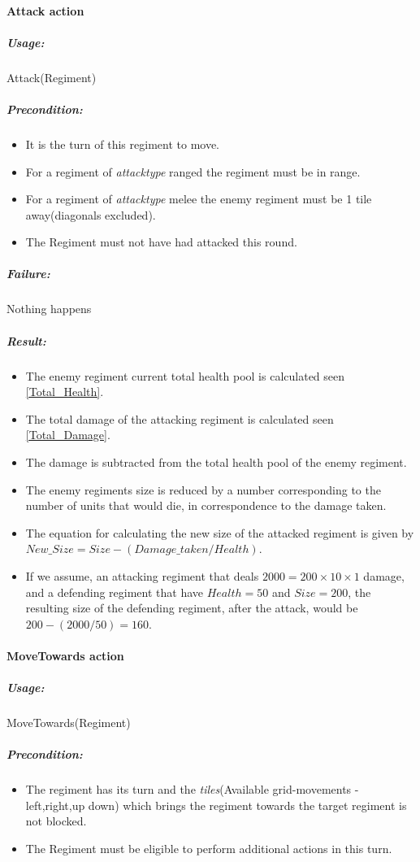 		\paragraph{Attack action}
		\subparagraph{Usage:} 
		Attack(Regiment)
		
		\subparagraph{Precondition:} 
		\begin{itemize}\itemsep0.0001cm
		\item It is the turn of this regiment to move.
		\item For a regiment of \textit{attacktype} ranged the regiment must be in range. 
		\item For a regiment of \textit{attacktype} melee the enemy regiment must be 1 tile away(diagonals excluded).
		\item The Regiment must not have had attacked this round.
		\end{itemize}
		\subparagraph{Failure:} 
		Nothing happens
		
		\subparagraph{Result:}
		\begin{itemize} 
		\item The enemy regiment current total health pool is calculated seen \ref{Total_Health}.
		\item The total damage of the attacking regiment is calculated seen \ref{Total_Damage}.
		\item The damage is subtracted from the total health pool of the enemy regiment.
		\item The enemy regiments size is reduced by a number corresponding to the number of units that would die, in correspondence to the damage taken.
		\item The equation for calculating the new size of the attacked regiment is given by 
		\subitem \label{New_Size}$New\_Size = Size - (Damage\_taken / Health)$.
		\item If we assume, an attacking regiment that deals $2000 = 200 \times 10 \times 1$ damage, and a defending regiment that have $Health = 50$ and $Size = 200$, the resulting size of the defending regiment, after the attack, would be $200-(2000/50)=160$.
		\end{itemize}
		\paragraph{MoveTowards action}
		\subparagraph{Usage:} 
		MoveTowards(Regiment)
		
		\subparagraph{Precondition:} 
		\begin{itemize}\itemsep0.0001cm
			\item The regiment has its turn and the \textit{tiles}(Available grid-movements - left,right,up down) 
		which brings the regiment towards the target regiment is not blocked.\\
			\item The Regiment must be eligible to perform additional actions in this turn.\\
		\end{itemize}
		
